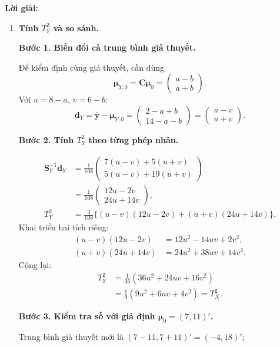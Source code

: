 \documentclass[11pt,a4paper]{article}
\renewcommand{\boldsymbol}[1]{\symbf{#1}}
\newenvironment{solution}{%
  \par\medskip\noindent\textbf{Lời giải:}\par\nobreak\smallskip\noindent\ignorespaces
}{\par}
\newcommand{\answer}[1]{\boxed{#1}}
\newcommand{\step}[2]{\par\medskip\noindent\textbf{Bước #1. #2}\par\nopagebreak[4]\smallskip\noindent}
\begin{document}
\begin{solution}
\begin{enumerate}[label=\textbf{\alph*)}]
Cuối cùng, câu ``thực hiện từ phải sang trái'' thường nói về
\emph{thứ tự tác động lên vectơ cột}. Trong $\mathbf{A}\mathbf{B}\mathbf{x}$,
nếu thực hiện lần lượt các phép biến đổi thì
\[
\mathbf{x}\ \longmapsto\ \mathbf{B}\mathbf{x}
\ \longmapsto\ \mathbf{A}(\mathbf{B}\mathbf{x}).
\]
Tuy nhiên, nhờ tính kết hợp, vẫn có thể tính trước
$\mathbf{M}=\mathbf{A}\mathbf{B}$ rồi tính $\mathbf{M}\mathbf{x}$.
\textbf{Thứ tự các ma trận giữ nguyên; chỉ thứ tự thực hiện các phép tính
trung gian được thay đổi.}
\item \textbf{Tính $T_Y^2$ và so sánh.}\par\nopagebreak[4]
\step{1}{Biến đổi cả trung bình giả thuyết.}
Để kiểm định cùng giả thuyết, cần dùng
\[
\boldsymbol{\mu}_{Y,0}=\mathbf{C}\boldsymbol{\mu}_0
=\begin{pmatrix}a-b\\a+b\end{pmatrix}.
\]
Với $u=8-a$, $v=6-b$:
\[
\mathbf{d}_Y=\bar{\mathbf{y}}-\boldsymbol{\mu}_{Y,0}
=\begin{pmatrix}2-a+b\\14-a-b\end{pmatrix}
=\begin{pmatrix}u-v\\u+v\end{pmatrix}.
\]
\step{2}{Tính $T_Y^2$ theo từng phép nhân.}
\begin{align*}
\mathbf{S}_Y^{-1}\mathbf{d}_Y
&=\frac1{108}\begin{pmatrix}7(u-v)+5(u+v)\\5(u-v)+19(u+v)\end{pmatrix}\\
&=\frac1{108}\begin{pmatrix}12u-2v\\24u+14v\end{pmatrix},\\
T_Y^2&=\frac3{108}\{(u-v)(12u-2v)+(u+v)(24u+14v)\}.
\end{align*}
Khai triển hai tích riêng:
\begin{align*}
(u-v)(12u-2v)&=12u^2-14uv+2v^2,\\
(u+v)(24u+14v)&=24u^2+38uv+14v^2.
\end{align*}
Cộng lại:
\begin{align*}
T_Y^2&=\frac1{36}(36u^2+24uv+16v^2)\\
&=\frac19(9u^2+6uv+4v^2)=\answer{T_X^2}.
\end{align*}
\step{3}{Kiểm tra số với giả định $\boldsymbol{\mu}_0=(7,11)'$.}
Trung bình giả thuyết mới là $(7-11,7+11)'=(-4,18)'$;

\end{enumerate}
\end{solution}
\end{document}
